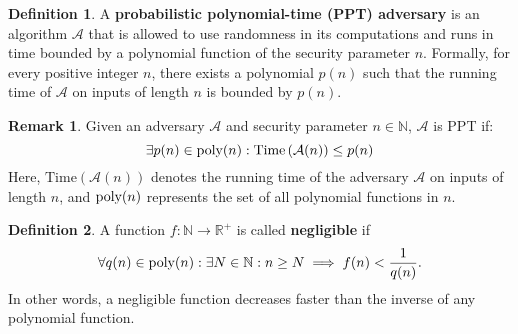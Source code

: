 \documentclass[12pt,openany]{book}
\theoremstyle{definition}
\newtheorem{definition}{Definition}[chapter]
\newtheorem{remark}{Remark}[section]
\newcommand{\N}{\mathbb{N}}
\newcommand{\R}{\mathbb{R}}
\newcommand{\of}[1]{\left( #1 \right)}
\newcommand{\A}{\mathcal{A}}
\newcommand{\poly}{\textnormal{poly}}
\newcommand{\Time}{\textnormal{Time}}
\begin{document}
	\begin{tcolorbox}[colback=white,colframe=defcolor, title={\color{white}\bf Probabilistic Polynomial-Time Adversary}]
		\begin{definition}
			A \textbf{probabilistic polynomial-time (PPT) adversary} is an algorithm $\A$ that is allowed to use randomness in its computations and runs in time bounded by a polynomial function of the security parameter $n$. Formally, for every positive integer $n$, there exists a polynomial $p(n)$ such that the running time of $\A$ on inputs of length $n$ is bounded by $p(n)$. 
		\end{definition}
	\end{tcolorbox}
	\begin{remark}
		Given an adversary $\A$ and security parameter $n\in\N$, $\A$ is PPT if: \[
		\exists p(n)\in\poly(n):\Time\of{\A(n)}\leq p(n)
		\] 
		Here, $\text{Time}(\A(n))$ denotes the running time of the adversary $\A$ on inputs of length $n$, and $\poly(n)$ represents the set of all polynomial functions in $n$.
	\end{remark}
	\vspace{8pt}
	\begin{tcolorbox}[colback=white,colframe=defcolor, title={\color{white}\bf Negligible Function}]
		\begin{definition}
			A function $f:\N\to\R^+$ is called \textbf{negligible} if \[
			\forall q(n)\in\poly(n):\exists N\in\N:n\geq N\implies f(n)<\frac{1}{q(n)}.
			\] In other words, a negligible function decreases faster than the inverse of any polynomial function.
		\end{definition}
	\end{tcolorbox}
	\vspace{8pt}
\end{document}
